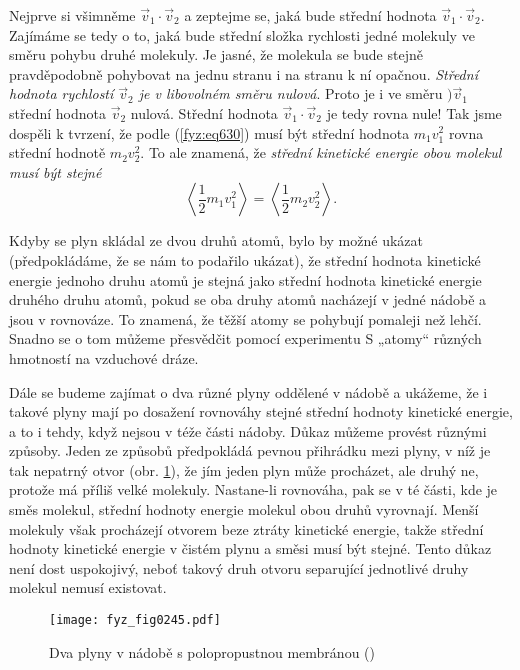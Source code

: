     Nejprve si všimněme \(\vec{v}_1\cdot\vec{v}_2\) a zeptejme se, jaká bude střední hodnota
    \(\vec{v}_1\cdot\vec{v}_2\). Zajímáme se tedy o to, jaká bude střední složka rychlosti jedné
    molekuly ve směru pohybu druhé molekuly. Je jasné, že molekula se bude stejně pravděpodobně
    pohybovat na jednu stranu i na stranu k ní opačnou. \emph{Střední hodnota rychlostí
    \(\vec{v}_2\) je v libovolném směru nulová}. Proto je i ve směru \()\vec{v}_1\) střední hodnota
    \(\vec{v}_2\) nulová. Střední hodnota \(\vec{v}_1\cdot\vec{v}_2\) je tedy rovna nule! Tak jsme
    dospěli k tvrzení, že podle (\ref{fyz:eq630}) musí být střední hodnota \(m_1v^2_1\) rovna
    střední hodnotě \(m_2v^2_2\). To ale znamená, že \emph{střední kinetické energie obou molekul
    musí být stejné}
    \begin{equation}\label{fyz:eq631}
      \left\langle\frac{1}{2}m_1v^2_1\right\rangle = \left\langle\frac{1}{2}m_2v^2_2\right\rangle.
    \end{equation}

    Kdyby se plyn skládal ze dvou druhů atomů, bylo by možné ukázat (předpokládáme, že se nám
    to podařilo ukázat), že střední hodnota kinetické energie jednoho druhu atomů je stejná jako
    střední hodnota kinetické energie druhého druhu atomů, pokud se oba druhy atomů nacházejí v
    jedné nádobě a jsou v rovnováze. To znamená, že těžší atomy se pohybují pomaleji než lehčí.
    Snadno se o tom můžeme přesvědčit pomocí experimentu S „atomy“ různých hmotností na vzduchové
    dráze.

    Dále se budeme zajímat o dva různé plyny oddělené v nádobě a ukážeme, že i takové plyny mají po
    dosažení rovnováhy stejné střední hodnoty kinetické energie, a to i tehdy, když nejsou v téže
    části nádoby. Důkaz můžeme provést různými způsoby. Jeden ze způsobů předpokládá pevnou
    přihrádku mezi plyny, v níž je tak nepatrný otvor (obr. \ref{fyz:fig0245}), že jím jeden plyn
    může procházet, ale druhý ne, protože má příliš velké molekuly. Nastane-li rovnováha, pak se v
    té části, kde je směs molekul, střední hodnoty energie molekul obou druhů vyrovnají. Menší
    molekuly však procházejí otvorem beze ztráty kinetické energie, takže střední hodnoty kinetické
    energie v čistém plynu a směsi musí být stejné. Tento důkaz není dost uspokojivý, neboť takový
    druh otvoru separující jednotlivé druhy molekul nemusí existovat.

    \begin{figure}[ht!] %
      \centering
      \texttt{[image: fyz\_fig0245.pdf]}
      \caption{Dva plyny v nádobě s polopropustnou membránou (\cite[s.~533]{Feynman01})}
      \label{fyz:fig0245}
    \end{figure}

